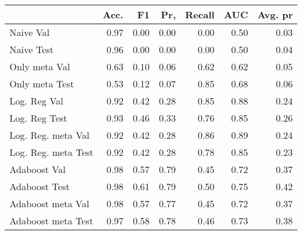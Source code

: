 \begin{tabular}{lrrrrrr}
\toprule
{} &  Acc. &    F1 &   Pr, &  Recall &   AUC &  Avg. pr \\
\midrule
Naive Val           &  0.97 &  0.00 &  0.00 &    0.00 &  0.50 &     0.03 \\
Naive Test          &  0.96 &  0.00 &  0.00 &    0.00 &  0.50 &     0.04 \\
Only meta Val       &  0.63 &  0.10 &  0.06 &    0.62 &  0.62 &     0.05 \\
Only meta Test      &  0.53 &  0.12 &  0.07 &    0.85 &  0.68 &     0.06 \\
Log. Reg Val        &  0.92 &  0.42 &  0.28 &    0.85 &  0.88 &     0.24 \\
Log. Reg Test       &  0.93 &  0.46 &  0.33 &    0.76 &  0.85 &     0.26 \\
Log. Reg. meta Val  &  0.92 &  0.42 &  0.28 &    0.86 &  0.89 &     0.24 \\
Log. Reg. meta Test &  0.92 &  0.42 &  0.28 &    0.78 &  0.85 &     0.23 \\
Adaboost Val        &  0.98 &  0.57 &  0.79 &    0.45 &  0.72 &     0.37 \\
Adaboost Test       &  0.98 &  0.61 &  0.79 &    0.50 &  0.75 &     0.42 \\
Adaboost meta Val   &  0.98 &  0.57 &  0.77 &    0.45 &  0.72 &     0.37 \\
Adaboost meta Test  &  0.97 &  0.58 &  0.78 &    0.46 &  0.73 &     0.38 \\
\bottomrule
\end{tabular}
